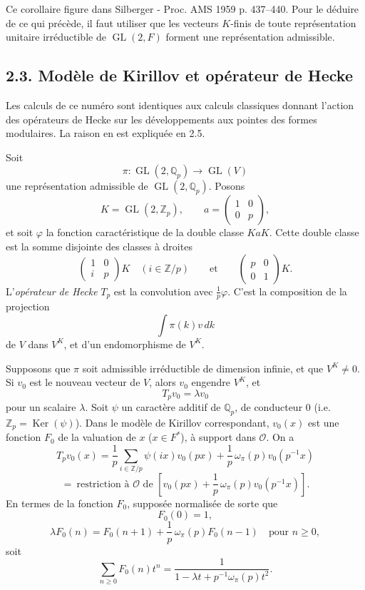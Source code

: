 \documentclass[10pt,a4paper]{article}
\providecommand{\GL}{\operatorname{GL}}
\providecommand{\Q}{\mathbb Q}
\providecommand{\Z}{\mathbb Z}
\providecommand{\OO}{\mathcal O}
\begin{document}
Ce corollaire figure dans Silberger - Proc. AMS 1959 p. 437--440. Pour le déduire de ce qui précède, il faut utiliser que les vecteurs \(K\)-finis de toute représentation unitaire irréductible de \(\GL(2,F)\) forment une représentation admissible.

\subsection*{2.3. Modèle de Kirillov et opérateur de Hecke}

Les calculs de ce numéro sont identiques aux calculs classiques donnant l'action des opérateurs de Hecke sur les développements aux pointes des formes modulaires. La raison en est expliquée en 2.5.

Soit
\[
\pi:\GL(2,\Q_p)\longrightarrow\GL(V)
\]
une représentation admissible de \(\GL(2,\Q_p)\). Posons
\[
K=\GL(2,\Z_p),\qquad
a=\begin{pmatrix}1&0\\0&p\end{pmatrix},
\]
et soit \(\varphi\) la fonction caractéristique de la double classe \(KaK\). Cette double classe est la somme disjointe des classes à droites
\[
\begin{pmatrix}1&0\\ i&p\end{pmatrix}K\quad(i\in\Z/p)
\qquad\text{et}\qquad
\begin{pmatrix}p&0\\0&1\end{pmatrix}K.
\]
L'\emph{opérateur de Hecke} \(T_p\) est la convolution avec \(\frac1p\varphi\). C'est la composition de la projection
\[
\int\pi(k)v\,dk
\]
de \(V\) dans \(V^K\), et d'un endomorphisme de \(V^K\).

\clearpage
{}
\hypertarget{authority-30}{}
Supposons que \(\pi\) soit admissible irréductible de dimension infinie, et que \(V^K\ne0\). Si \(v_0\) est le nouveau vecteur de \(V\), alors \(v_0\) engendre \(V^K\), et
\[
T_pv_0=\lambda v_0
\]
pour un scalaire \(\lambda\). Soit \(\psi\) un caractère additif de \(\Q_p\), de conducteur \(0\) (i.e. \(\Z_p=\operatorname{Ker}(\psi)\)). Dans le modèle de Kirillov correspondant, \(v_0(x)\) est une fonction \(F_0\) de la valuation de \(x\) (\(x\in F^*\)), à support dans \(\OO\). On a
\[
T_pv_0(x)=
\frac1p\sum_{i\in\Z/p}\psi(ix)v_0(px)
+\frac1p\,\omega_\pi(p)v_0(p^{-1}x)
\]
\[
=\ \text{restriction à }\OO\text{ de }
\left[v_0(px)+\frac1p\,\omega_\pi(p)v_0(p^{-1}x)\right].
\]
En termes de la fonction \(F_0\), supposée normalisée de sorte que
\[
F_0(0)=1,
\]
\[
\lambda F_0(n)=F_0(n+1)+\frac1p\,\omega_\pi(p)F_0(n-1)
\quad\text{pour }n\ge0,
\]
soit
\[
\sum_{n\ge0}F_0(n)t^n
=
\frac1{1-\lambda t+p^{-1}\omega_\pi(p)t^2}.
\]
\end{document}
